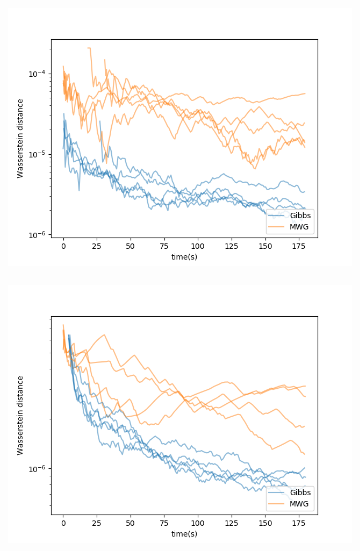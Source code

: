 \begin{figure}[h]
\begin{subfigure}{0.3\linewidth}
    	\includegraphics[width=\linewidth]{../../plots/KL_M3_N100_NMCMC3_seed0_diffind2.png}
	\end{subfigure}
	\begin{subfigure}{0.3\linewidth}
	    \centering
    	\includegraphics[width=\linewidth]{../../plots/KL_M4_N100_NMCMC3_seed0_diffind2.png}
	\end{subfigure}
	\begin{subfigure}{0.3\linewidth}
	    \centering

\end{subfigure}
\end{figure}
